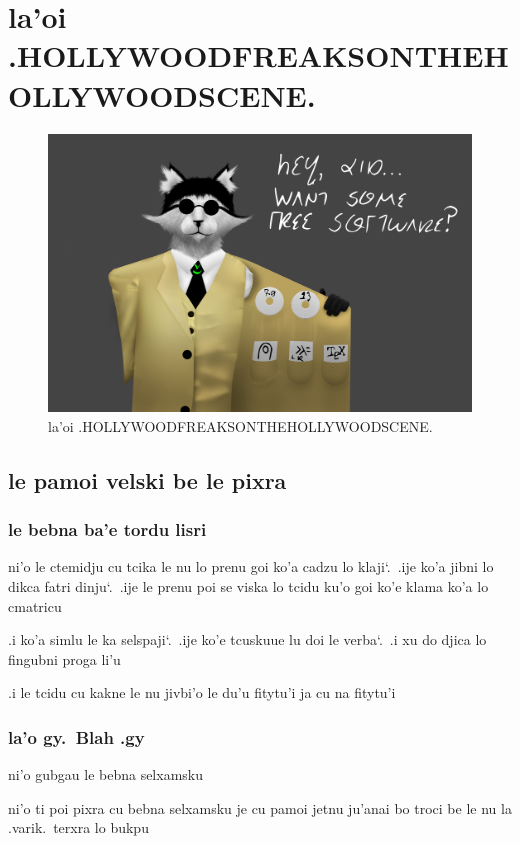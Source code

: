 \documentclass{report}
\newcommand\sds{\spacefactor\sfcode`.\ \space}
\begin{document}
\chapter{la'oi .HOLLYWOODFREAKSONTHEHOLLYWOODSCENE.}
\begin{figure}[ht]
	\centering
	\includegraphics[keepaspectratio, width=\textwidth, height=0.75\textheight]{hollywoodfreaksonthehollywoodscene/hollywoodfreaksonthehollywoodscene.png}
	\caption[center]{la'oi .HOLLYWOODFREAKSONTHEHOLLYWOODSCENE.}
\end{figure}
\section{le pamoi velski be le pixra}
\subsection{le bebna ba'e tordu lisri}
ni'o le ctemidju cu tcika le nu lo prenu goi ko'a cadzu lo klaji\sds  .ije ko'a jibni lo dikca fatri dinju\sds  .ije le prenu poi se viska lo tcidu ku'o goi ko'e klama ko'a lo cmatricu

.i ko'a simlu le ka selspaji\sds  .ije ko'e tcuskuue lu doi le verba\sds  .i xu do djica lo fingubni proga li'u

.i le tcidu cu kakne le nu jivbi'o le du'u fitytu'i ja cu na fitytu'i

\subsection{la'o gy.\ Blah .gy}
ni'o gubgau le bebna selxamsku

ni'o ti poi pixra cu bebna selxamsku je cu pamoi jetnu ju'anai bo troci be le nu la .varik.\ terxra lo bukpu
\end{document}
